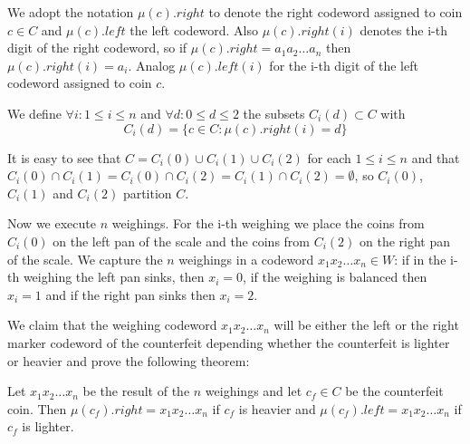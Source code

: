  We adopt the notation $\mu(c).right$ to denote the right codeword assigned to coin $c \in C$ and $\mu(c).left$ the left codeword. Also $\mu(c).right(i)$ denotes the i-th digit of the right codeword, so if $\mu(c).right = a_1 a_2 \ldots a_n$ then $\mu(c).right(i) = a_i$. Analog $\mu(c).left(i)$ for the i-th digit of the left codeword assigned to coin $c$. 

We define $\forall i: 1 \leq i \leq n$ and $\forall d: 0 \leq d \leq 2$ the subsets $C_i(d) \subset C$  with 
$$
C_i(d) = \{ c \in C: \mu(c).right(i) = d\}
$$

It is easy to see that $C = C_i(0) \cup C_i(1) \cup C_i(2)$ for each $1 \leq i \leq n$ and that $C_i(0) \cap C_i(1) = C_i(0) \cap C_i(2) = C_i(1) \cap C_i(2) =\emptyset$, so $C_i(0)$, $C_i(1)$ and $C_i(2)$ partition $C$.

Now we execute $n$ weighings. For the i-th weighing we place the coins from $C_i(0)$ on the left pan of the scale and the coins from $C_i(2)$ on the right pan of the scale. We capture the $n$ weighings in a codeword $x_1 x_2 \ldots x_n \in W$: if in the i-th weighing the left pan sinks, then $x_i=0$, if the weighing is balanced then $x_i=1$ and if the right pan sinks then $x_i=2$. 

We claim that the weighing codeword $x_1 x_2 \ldots x_n$ will be either the left or the right marker codeword of the counterfeit depending whether the counterfeit is lighter or heavier and prove the following theorem:

\begin{thm}\label{coin_encoding}
Let $x_1 x_2 \ldots x_n$ be the result of the $n$ weighings and let $c_f \in C$ be the counterfeit coin.
Then $\mu(c_f).right = x_1 x_2 \ldots x_n$ if $c_f$ is heavier and $\mu(c_f).left = x_1 x_2 \ldots x_n$ if $c_f$ is lighter.
\end{thm}

